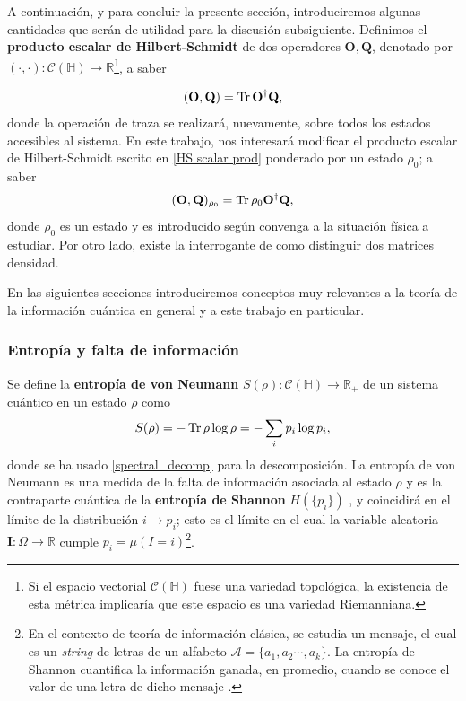 \documentclass{report} %
\numberwithin{equation}{section}
\begin{document}
A continuación, y para concluir la presente sección, introduciremos algunas cantidades  que serán de utilidad para la discusión subsiguiente. Definimos el \textbf{producto escalar de Hilbert-Schmidt} de dos operadores \cite{HeinzPetruccione} $\mathbf{O}, \mathbf{Q}$, denotado por $(\cdot,\cdot): \mathcal{C}(\mathds{H}) \rightarrow \mathds{R}$\footnote{Si el espacio vectorial $\mathcal{C}(\mathds{H})$ fuese una variedad topológica, la existencia de esta métrica implicaría que este espacio es una variedad Riemanniana.}, a saber

\begin{equation}
    (\mathbf{O},\mathbf{Q}) = \Tr\mathbf{O}^{\dagger}\mathbf{Q},
    \label{HS scalar prod}
\end{equation}
donde la operación de traza se realizará, nuevamente, sobre todos los estados accesibles al sistema. En este trabajo, nos interesará modificar el producto escalar de Hilbert-Schmidt escrito en \eqref{HS scalar prod} ponderado por un estado $\rho_0$; a saber
\begin{equation}
    (\mathbf{O},\mathbf{Q})_{\rho_0} = \Tr\rho_0\mathbf{O}^{\dagger}\mathbf{Q},
    \label{HS scalar prod pond}
\end{equation}
donde $\rho_0$ es un estado y es introducido según convenga a la situación física a estudiar.
Por otro lado, existe la interrogante de como distinguir dos matrices densidad. 

En las siguientes secciones introduciremos conceptos muy relevantes a la teoría de la información cuántica en general y a este trabajo en particular. 

\clearpage

\subsubsection{Entropía y falta de información}
 Se define la \textbf{entropía de von Neumann} $S(\rho): \mathcal{C}(\mathds{H}) \rightarrow \mathds{R}_{+}$ de un sistema cuántico en un estado $\rho$ \cite{Nielsen.00, HeinzPetruccione, VonNeumann:1955, WehrlA, Neumann1927} como 
 \begin{align}
     S(\rho) = - \Tr \rho \log \rho = - \sum_i p_i \log p_i,
     \label{von Neumann's entropy}
 \end{align}
 donde se ha usado \eqref{spectral_decomp} para la descomposición.
 La entropía de von Neumann es una medida de la falta de información asociada al estado $\rho$ y es la contraparte cuántica de la \textbf{entropía de Shannon} $H(\{p_i\})$
 \cite{Shannon48}, y coincidirá en el límite de la distribución $i \rightarrow p_i$; esto es el límite en el cual la variable aleatoria $\mathbf{I}: \Omega \rightarrow \mathds{R}$ cumple $p_i = \mu (I=i)$\footnote{ En el contexto de teoría de información clásica, se estudia un mensaje, el cual es un \textit{string} de letras de un alfabeto $\mathcal{A}=\{a_1,a_2 \cdots, a_k\}$. La entropía de Shannon cuantifica la información ganada, en promedio, cuando se conoce el valor de una letra de dicho mensaje \cite{BE07}. }\cite{HeinzPetruccione, BE07}.
\end{document}
